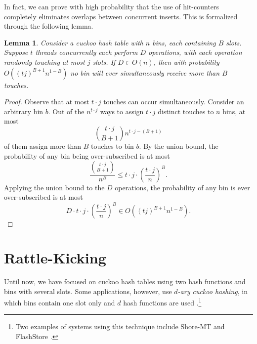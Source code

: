 \documentclass{sig-alternate-05-2015}
\newtheorem{lem}[thm]{Lemma}
\begin{document}
In fact, we can prove with high probability that the use of
hit-counters completely eliminates overlaps between concurrent
inserts. This is formalized through the following
lemma.

\begin{lem}\label{lemhighprob}
  Consider a cuckoo hash table with $n$ bins, each containing $B$
  slots. Suppose $t$ threads concurrently each perform $D$ operations,
  with each operation randomly touching at most $j$ slots. If $D \in
  O(n)$, then with probability $O((tj)^{B + 1}n^{1-B})$ no bin will
  ever simultaneously receive more than $B$ touches.
\end{lem}
\begin{proof}
  Observe that at most $t \cdot j$ touches can occur
  simultaneously. Consider an arbitrary bin $b$. Out of the $n^{t\cdot
    j}$ ways to assign $t \cdot j$ distinct touches to $n$ bins, at
  most $${{t \cdot j} \choose {B + 1}} n^{t \cdot j - (B + 1)}$$ of
  them assign more than $B$ touches to bin $b$. By the union bound,
  the probability of any bin being over-subscribed is at most
  $$\frac{{{t \cdot j} \choose {B + 1}}}{n^B} \le t \cdot j \cdot
  \left(\frac{t \cdot j}{n}\right)^B.$$ Applying the union bound to
  the $D$ operations, the probability of any bin is ever
  over-subscribed is at most
  $$D \cdot t \cdot j \cdot \left( \frac{t \cdot j}{n} \right)^B \in
  O((tj)^{B + 1}n^{1-B}).$$
\end{proof}







































\section{Rattle-Kicking} \label{sec_dary_walk} 

Until now, we have focused on cuckoo hash tables using two hash
functions and bins with several slots. Some applications, however, use
\emph{$d$-ary cuckoo hashing}, in which bins contain one slot only and
$d$ hash functions are used \cite{dary}.\footnote{Two examples of
  systems using this technique include Shore-MT \cite{flash10} and
  FlashStore \cite{johnson09}.}
\end{document}
